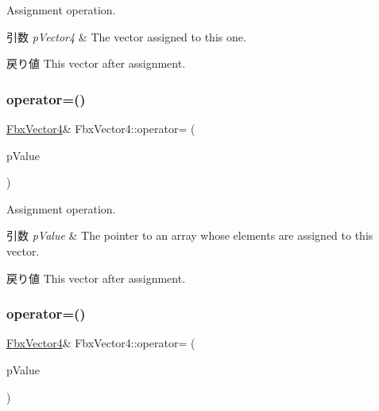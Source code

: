 Assignment operation. 
\begin{DoxyParams}{引数}
{\em p\+Vector4} & The vector assigned to this one. \\
\hline
\end{DoxyParams}
\begin{DoxyReturn}{戻り値}
This vector after assignment. 
\end{DoxyReturn}
\mbox{\label{class_fbx_vector4_aa769657f335b31564497a8950fc50213}} 
\subsubsection{\texorpdfstring{operator=()}{operator=()}\hspace{0.1cm}{\footnotesize\ttfamily [2/3]}}
{\footnotesize\ttfamily \hyperlink{class_fbx_vector4}{Fbx\+Vector4}\& Fbx\+Vector4\+::operator= (\begin{DoxyParamCaption}\item[{const double $\ast$}]{p\+Value }\end{DoxyParamCaption})}

Assignment operation. 
\begin{DoxyParams}{引数}
{\em p\+Value} & The pointer to an array whose elements are assigned to this vector. \\
\hline
\end{DoxyParams}
\begin{DoxyReturn}{戻り値}
This vector after assignment. 
\end{DoxyReturn}
\mbox{\label{class_fbx_vector4_afd3267e501ae3b8932d2a1c6a3ee378a}} 
\subsubsection{\texorpdfstring{operator=()}{operator=()}\hspace{0.1cm}{\footnotesize\ttfamily [3/3]}}
{\footnotesize\ttfamily \hyperlink{class_fbx_vector4}{Fbx\+Vector4}\& Fbx\+Vector4\+::operator= (\begin{DoxyParamCaption}\item[{const \hyperlink{fbxtypes_8h_ae0a96f14cde566774c7553aa7523b7a7}{Fbx\+Double3} \&}]{p\+Value }\end{DoxyParamCaption})}

